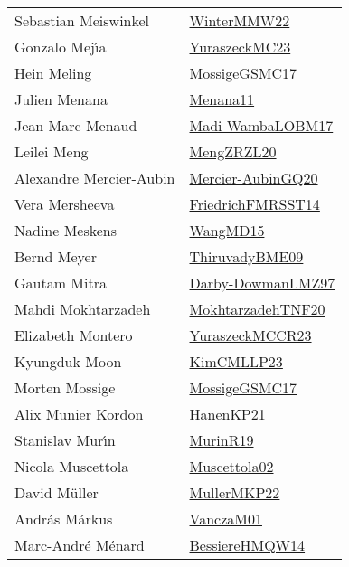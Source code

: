 {\begin{longtable}{p{4cm}p{20cm}}
Sebastian Meiswinkel & \href{papers/WinterMMW22.pdf}{WinterMMW22}\cite{WinterMMW22} \\
Gonzalo Mej{\'{\i}}a & \href{papers/YuraszeckMC23.pdf}{YuraszeckMC23}\cite{YuraszeckMC23} \\
Hein Meling & \href{papers/MossigeGSMC17.pdf}{MossigeGSMC17}\cite{MossigeGSMC17} \\
Julien Menana & \href{}{Menana11}\cite{Menana11} \\
Jean{-}Marc Menaud & \href{papers/Madi-WambaLOBM17.pdf}{Madi-WambaLOBM17}\cite{Madi-WambaLOBM17} \\
Leilei Meng & \href{articles/MengZRZL20.pdf}{MengZRZL20}\cite{MengZRZL20} \\
Alexandre Mercier{-}Aubin & \href{papers/Mercier-AubinGQ20.pdf}{Mercier-AubinGQ20}\cite{Mercier-AubinGQ20} \\
Vera Mersheeva & \href{}{FriedrichFMRSST14}\cite{FriedrichFMRSST14} \\
Nadine Meskens & \href{articles/WangMD15.pdf}{WangMD15}\cite{WangMD15} \\
Bernd Meyer & \href{papers/ThiruvadyBME09.pdf}{ThiruvadyBME09}\cite{ThiruvadyBME09} \\
Gautam Mitra & \href{articles/Darby-DowmanLMZ97.pdf}{Darby-DowmanLMZ97}\cite{Darby-DowmanLMZ97} \\
Mahdi Mokhtarzadeh & \href{}{MokhtarzadehTNF20}\cite{MokhtarzadehTNF20} \\
Elizabeth Montero & \href{articles/YuraszeckMCCR23.pdf}{YuraszeckMCCR23}\cite{YuraszeckMCCR23} \\
Kyungduk Moon & \href{papers/KimCMLLP23.pdf}{KimCMLLP23}\cite{KimCMLLP23} \\
Morten Mossige & \href{papers/MossigeGSMC17.pdf}{MossigeGSMC17}\cite{MossigeGSMC17} \\
Alix Munier Kordon & \href{papers/HanenKP21.pdf}{HanenKP21}\cite{HanenKP21} \\
Stanislav Mur{\'{\i}}n & \href{papers/MurinR19.pdf}{MurinR19}\cite{MurinR19} \\
Nicola Muscettola & \href{papers/Muscettola02.pdf}{Muscettola02}\cite{Muscettola02} \\
David M{\"{u}}ller & \href{articles/MullerMKP22.pdf}{MullerMKP22}\cite{MullerMKP22} \\
Andr{\'{a}}s M{\'{a}}rkus & \href{papers/VanczaM01.pdf}{VanczaM01}\cite{VanczaM01} \\
Marc{-}Andr{\'{e}} M{\'{e}}nard & \href{papers/BessiereHMQW14.pdf}{BessiereHMQW14}\cite{BessiereHMQW14} \\

\end{longtable}}
